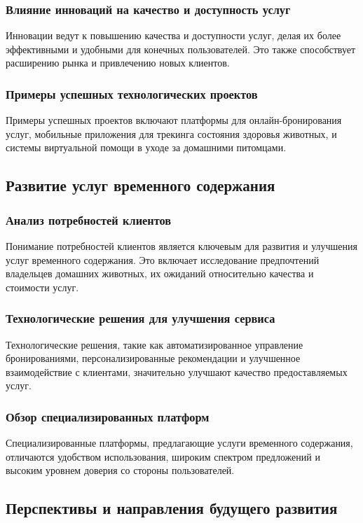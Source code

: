 \subsubsection{Влияние инноваций на качество и доступность услуг}

Инновации ведут к повышению качества и доступности услуг, делая их более эффективными и удобными для конечных пользователей. Это также способствует расширению рынка и привлечению новых клиентов.
\subsubsection{Примеры успешных технологических проектов}

Примеры успешных проектов включают платформы для онлайн-бронирования услуг, мобильные приложения для трекинга состояния здоровья животных, и системы виртуальной помощи в уходе за домашними питомцами.
\subsection{Развитие услуг временного содержания}
\subsubsection{Анализ потребностей клиентов}

Понимание потребностей клиентов является ключевым для развития и улучшения услуг временного содержания. Это включает исследование предпочтений владельцев домашних животных, их ожиданий относительно качества и стоимости услуг.
\subsubsection{Технологические решения для улучшения сервиса}

Технологические решения, такие как автоматизированное управление бронированиями, персонализированные рекомендации и улучшенное взаимодействие с клиентами, значительно улучшают качество предоставляемых услуг.
\subsubsection{Обзор специализированных платформ}

Специализированные платформы, предлагающие услуги временного содержания, отличаются удобством использования, широким спектром предложений и высоким уровнем доверия со стороны пользователей.
\subsection{Перспективы и направления будущего развития}
